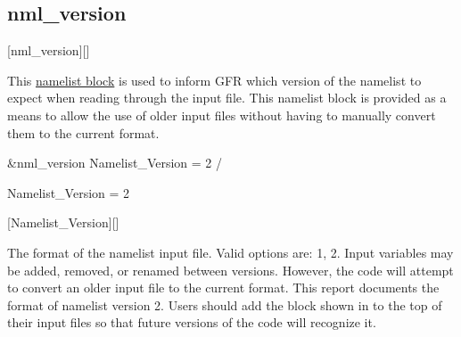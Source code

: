 \subsection{nml\_version}
\label{SEC:nml_version}
\inp*[nmlVersion]{}[nml\_version][]

This \hyperref[SEC:User_Input]{namelist block}
is used to inform GFR which version of the namelist to expect when reading
through the input file.
%
This namelist block is provided as a means to allow the use of older input files
without having to manually convert them to the current format.

\begin{nmlblocklst}[
,label={LST:nml_version}
,caption={Namelist nml\_version.}
]
&nml_version
  Namelist_Version = 2
/
\end{nmlblocklst}


\begin{nmldescitem}
Namelist_Version = 2
\end{nmldescitem}
[Namelist\_Version][]

\begin{nmldescbody}
The format of the namelist input file.
Valid options are: 1, 2.
%
Input variables may be added, removed, or renamed between versions.
However, the code will attempt to convert an older input file to the
current format.
%
This report documents the format of namelist version 2. Users should add the
 block shown in  to the top of
their input files so that future versions of the code will recognize it.
\end{nmldescbody}


